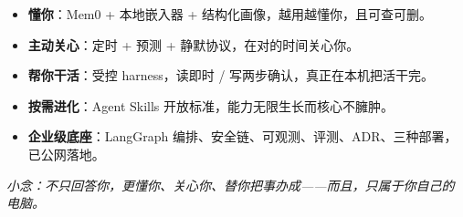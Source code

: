 \begin{itemize}[leftmargin=1.4em]
  \item \textbf{懂你}：Mem0 + 本地嵌入器 + 结构化画像，越用越懂你，且可查可删。
  \item \textbf{主动关心}：定时 + 预测 + 静默协议，在对的时间关心你。
  \item \textbf{帮你干活}：受控 harness，读即时 / 写两步确认，真正在本机把活干完。
  \item \textbf{按需进化}：Agent Skills 开放标准，能力无限生长而核心不臃肿。
  \item \textbf{企业级底座}：LangGraph 编排、安全链、可观测、评测、ADR、三种部署，已公网落地。
\end{itemize}

\vspace{0.5cm}
\begin{center}
\itshape\large\color{primary}
小念：不只回答你，更懂你、关心你、替你把事办成——而且，只属于你自己的电脑。
\end{center}
